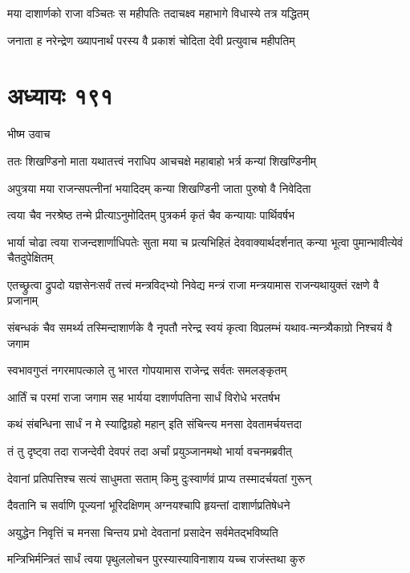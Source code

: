\twolineshloka
{मया दाशार्णको राजा वञ्चितः स महीपतिः}
{तदाचक्ष्व महाभागे विधास्ये तत्र यद्धितम्}


\twolineshloka
{जनाता ह नरेन्द्रेण ख्यापनार्थं परस्य वै}
{प्रकाशं चोदिता देवी प्रत्युवाच महीपतिम्}


\chapter{अध्यायः १९१}
\twolineshloka
{भीष्म उवाच}
{}


\twolineshloka
{ततः शिखण्डिनो माता यथातत्त्वं नराधिप}
{आचचक्षे महाबाहो भर्त्र कन्यां शिखण्डिनीम्}


\twolineshloka
{अपुत्रया मया राजन्सपत्नीनां भयादिदम्}
{कन्या शिखण्डिनी जाता पुरुषो वै निवेदिता}


\twolineshloka
{त्वया चैव नरश्रेष्ठ तन्मे प्रीत्याऽनुमोदितम्}
{पुत्रकर्म कृतं चैव कन्यायाः पार्थिवर्षभ}


\threelineshloka
{भार्या चोढा त्वया राजन्दशार्णाधिपतेः सुता}
{मया च प्रत्यभिहितं देववाक्यार्थदर्शनात्}
{कन्या भूत्वा पुमान्भावीत्येवं चैतदुपेक्षितम्}


\twolineshloka
{एतच्छ्रुत्वा द्रुपदो यज्ञसेनःसर्वं तत्त्वं मन्त्रविद्भ्यो निवेद्य}
{मन्त्रं राजा मन्त्रयामास राजन्यथायुक्तं रक्षणे वै प्रजानाम्}


\twolineshloka
{संबन्धकं चैव समर्थ्य तस्मिन्दाशार्णके वै नृपतौ नरेन्द्र}
{स्वयं कृत्वा विप्रलम्भं यथाव-न्मन्त्र्यैकाग्रो निश्चयं वै जगाम}


\twolineshloka
{स्वभावगुप्तं नगरमापत्काले तु भारत}
{गोपयामास राजेन्द्र सर्वतः समलङ्कृतम्}


\twolineshloka
{आर्तिं च परमां राजा जगाम सह भार्यया}
{दशार्णपतिना सार्धं विरोधे भरतर्षभ}


\twolineshloka
{कथं संबन्धिना सार्धं न मे स्याद्विग्रहो महान्}
{इति संचिन्त्य मनसा देवतामर्चयत्तदा}


\twolineshloka
{तं तु दृष्ट्वा तदा राजन्देवी देवपरं तदा}
{अर्चां प्रयुञ्जानमथो भार्या वचनमब्रवीत्}


\twolineshloka
{देवानां प्रतिपत्तिश्च सत्यं साधुमता सताम्}
{किमु दुःस्वार्णवं प्राप्य तस्मादर्चयतां गुरून्}


\twolineshloka
{दैवतानि च सर्वाणि पूज्यनां भूरिदक्षिणम्}
{अग्नयश्चापि हृयन्तां दाशार्णप्रतिषेधने}


\twolineshloka
{अयुद्धेन निवृत्तिं च मनसा चिन्तय प्रभो}
{देवतानां प्रसादेन सर्वमेतद्भविष्यति}


\twolineshloka
{मन्त्रिभिर्मन्त्रितं सार्धं त्वया पृथुललोचन}
{पुरस्यास्याविनाशाय यच्च राजंस्तथा कुरु}



